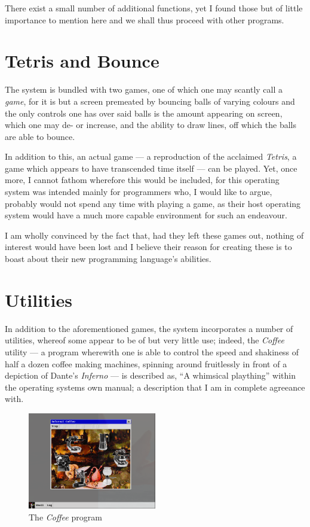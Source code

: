 \documentclass[a5paper,twoside,12pt]{report}
\begin{document}
  There exist a small number of additional functions, yet I found those but of little importance to mention here and we shall thus proceed with other programs.

  \section*{Tetris and Bounce}

  The system is bundled with two games, one of which one may scantly call a \textit{game}, for it is but a screen premeated by bouncing balls of varying colours and the only controls one has over said balls is the amount appearing on screen, which one may de- or increase, and the ability to draw lines, off which the balls are able to bounce.


  In addition to this, an actual game — a reproduction of the acclaimed \textit{Tetris}, a game which appears to have transcended time itself — can be played. Yet, once more, I cannot fathom wherefore this would be included, for this operating system was intended mainly for programmers who, I would like to argue, probably would not spend any time with playing a game, as their host operating system would have a much more capable environment for such an endeavour. 

  I am wholly convinced by the fact that, had they left these games out, nothing of interest would have been lost and I believe their reason for creating these is to boast about their new programming language's abilities.

  \section*{Utilities}

  In addition to the aforementioned games, the system incorporates a number of utilities, whereof some appear to be of but very little use; indeed, the \textit{Coffee} utility — a program wherewith one is able to control the speed and shakiness of half a dozen coffee making machines, spinning around fruitlessly in front of a depiction of Dante's \textit{Inferno} — is described as, ``A whimsical plaything'' within the operating systems own manual; a description that I am in complete agreeance with.

  \begin{figure}
    \centering
    \includegraphics[width=0.5\textwidth]{imgs/coffee.png}
    \caption{The \textit{Coffee} program}
  \end{figure}
\end{document}
